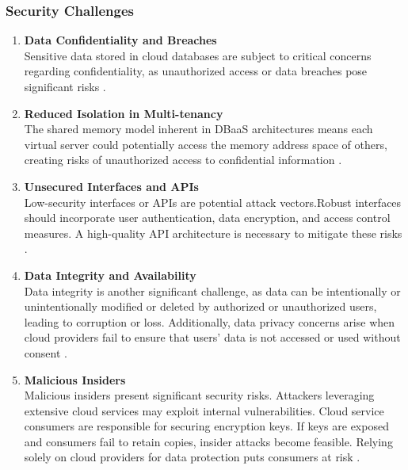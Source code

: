 \subsubsection{Security Challenges}
\begin{enumerate}[label=\alph*)]
    \item \textbf{Data Confidentiality and Breaches}\\    
    Sensitive data stored in cloud databases are subject to critical concerns regarding confidentiality, as unauthorized access or data breaches pose significant risks \cite{Security_Issues_and_Policies}.

    \item \textbf{Reduced Isolation in Multi-tenancy}\\
    The shared memory model inherent in DBaaS architectures means each virtual server could potentially access the memory address space of others, creating risks of unauthorized access to confidential information \cite{Security_Issues_and_Policies}.

    \item \textbf{Unsecured Interfaces and APIs}\\
    Low-security interfaces or APIs are potential attack vectors.Robust interfaces should incorporate user authentication, data encryption, and access control measures. A high-quality API architecture is necessary to mitigate these risks \cite{Security_Issues_and_Policies}.

    \item \textbf{Data Integrity and Availability}\\
    Data integrity is another significant challenge, as data can be intentionally or unintentionally modified or deleted by authorized or unauthorized users, leading to corruption or loss. Additionally, data privacy concerns arise when cloud providers fail to ensure that users’ data is not accessed or used without consent \cite{Security_Issues_and_Policies}.

    \item \textbf{Malicious Insiders}\\
    Malicious insiders present significant security risks. Attackers leveraging extensive cloud services may exploit internal vulnerabilities. Cloud service consumers are responsible for securing encryption keys. If keys are exposed and consumers fail to retain copies, insider attacks become feasible. Relying solely on cloud providers for data protection puts consumers at risk \cite{Security_Issues_and_Policies}.
    
\end{enumerate}
